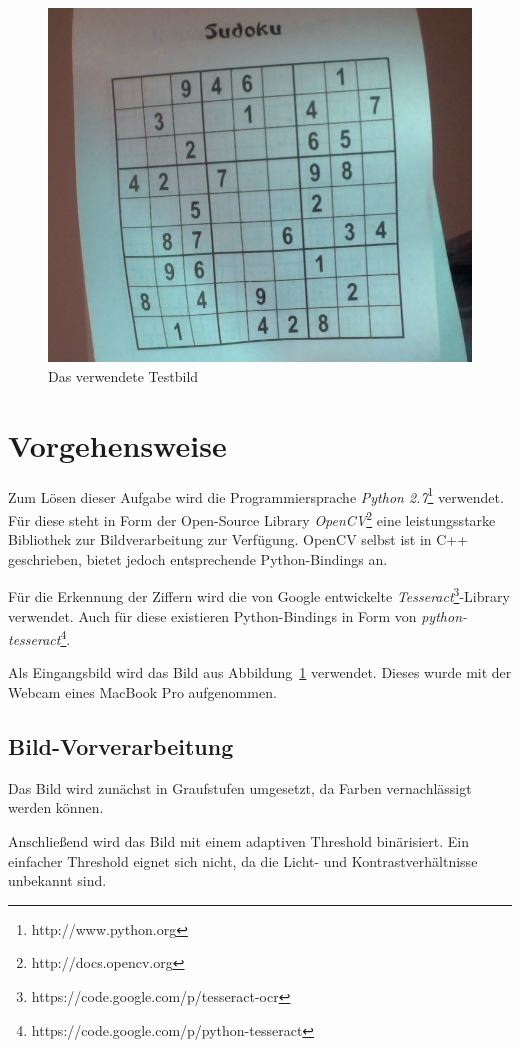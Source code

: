 
\begin{figure}[t]
    \begin{center}
        \includegraphics[width=.5\textwidth]{Abbildungen/Input}
    \end{center}
    \caption{Das verwendete Testbild}
    \label{fig:Input}
\end{figure}

\section{Vorgehensweise}
Zum Lösen dieser Aufgabe wird die Programmiersprache \emph{Python 2.7}\footnote{http://www.python.org} verwendet.
Für diese steht in Form der Open-Source Library \emph{OpenCV}\footnote{http://docs.opencv.org} eine leistungsstarke Bibliothek zur Bildverarbeitung zur Verfügung.
OpenCV selbst ist in C++ geschrieben, bietet jedoch entsprechende Python-Bindings an.

Für die Erkennung der Ziffern wird die von Google entwickelte \emph{Tesseract}\footnote{https://code.google.com/p/tesseract-ocr}-Library verwendet. Auch für diese existieren Python-Bindings in Form von \emph{python-tesseract}\footnote{https://code.google.com/p/python-tesseract}.

Als Eingangsbild wird das Bild aus Abbildung~\ref{fig:Input} verwendet. Dieses wurde mit der Webcam eines MacBook Pro aufgenommen.

\subsection{Bild-Vorverarbeitung}
Das Bild wird zunächst in Graufstufen umgesetzt, da Farben vernachlässigt werden können.

Anschließend wird das Bild mit einem adaptiven Threshold binärisiert. Ein einfacher Threshold eignet sich nicht, da die Licht- und Kontrastverhältnisse unbekannt sind.

